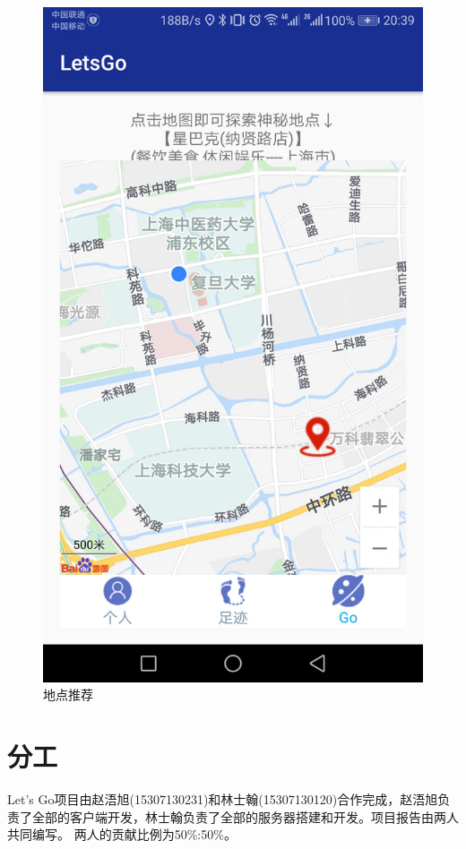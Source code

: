 \documentclass[UTF8]{article}
\begin{document}
\begin{figure}[H]
\begin{minipage}[t]{0.33\textwidth}
    \includegraphics[width=\textwidth]{images/demo_recommend.jpeg}
    \caption{地点推荐}
\end{minipage}
\end{figure}

\section{分工}
Let's Go项目由赵浯旭(15307130231)和林士翰(15307130120)合作完成，赵浯旭负责了全部的客户端开发，林士翰负责了全部的服务器搭建和开发。项目报告由两人共同编写。
两人的贡献比例为50\%:50\%。
\end{document}

